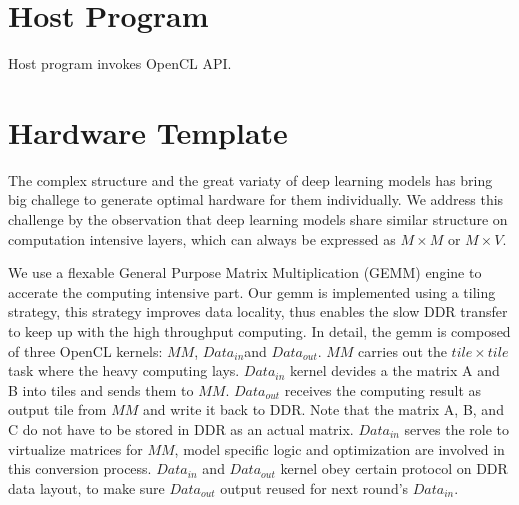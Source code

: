 \documentclass{acm_proc_article-sp-copy}
\begin{document}
\section{Host Program}
Host program invokes OpenCL API.

\section{Hardware Template}
The complex structure and the great variaty of deep learning models has bring big challege to generate optimal hardware for them individually.
We address this challenge by the observation that deep learning models share similar structure on computation intensive layers, which can always be expressed as $M\times M$ or $M\times V$.

We use a flexable General Purpose Matrix Multiplication (GEMM) engine to accerate the computing intensive part.
Our gemm is implemented using a tiling strategy, this strategy improves data locality, thus enables the slow DDR transfer to keep up with the high throughput computing.
In detail, the gemm is composed of three OpenCL kernels: $MM$, $Data_{in}$and $Data_{out}$.
$MM$ carries out the $tile \times tile$ task where the heavy computing lays.
$Data_{in}$ kernel devides a the matrix A and B into tiles and sends them to $MM$.
$Data_{out}$ receives the computing result as output tile from $MM$ and write it back to DDR.
Note that the matrix A, B, and C do not have to be stored in DDR as an actual matrix. $Data_{in}$ serves the role to virtualize matrices for $MM$, model specific logic and optimization are involved in this conversion process.
$Data_{in}$ and $Data_{out}$ kernel obey certain protocol on DDR data layout, to make sure $Data_{out}$ output reused for next round's $Data_{in}$.

\end{document}
